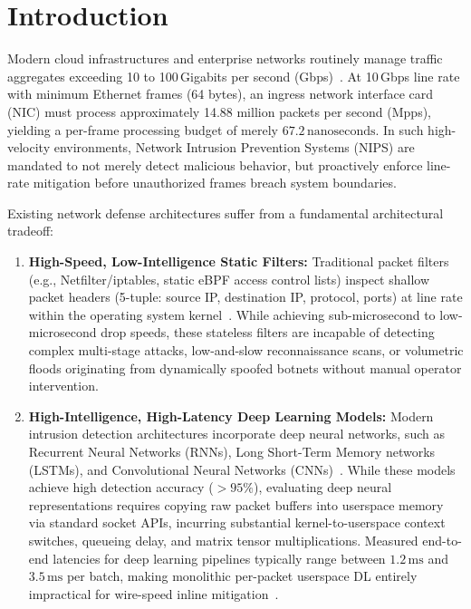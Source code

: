 \documentclass[conference,10pt]{IEEEtran}
\begin{document}
\section{Introduction}
Modern cloud infrastructures and enterprise networks routinely manage traffic aggregates exceeding 10 to 100\,Gigabits per second (Gbps)~\cite{scholz2021performance}. At 10\,Gbps line rate with minimum Ethernet frames (64 bytes), an ingress network interface card (NIC) must process approximately 14.88 million packets per second (Mpps), yielding a per-frame processing budget of merely $67.2\,\text{nanoseconds}$. In such high-velocity environments, Network Intrusion Prevention Systems (NIPS) are mandated to not merely detect malicious behavior, but proactively enforce line-rate mitigation before unauthorized frames breach system boundaries.

Existing network defense architectures suffer from a fundamental architectural tradeoff:
\begin{enumerate}
    \item \textbf{High-Speed, Low-Intelligence Static Filters:} Traditional packet filters (e.g., Netfilter/iptables, static eBPF access control lists) inspect shallow packet headers (5-tuple: source IP, destination IP, protocol, ports) at line rate within the operating system kernel~\cite{mccanne1993bsd, vieira2020fast}. While achieving sub-microsecond to low-microsecond drop speeds, these stateless filters are incapable of detecting complex multi-stage attacks, low-and-slow reconnaissance scans, or volumetric floods originating from dynamically spoofed botnets without manual operator intervention.
    \item \textbf{High-Intelligence, High-Latency Deep Learning Models:} Modern intrusion detection architectures incorporate deep neural networks, such as Recurrent Neural Networks (RNNs), Long Short-Term Memory networks (LSTMs), and Convolutional Neural Networks (CNNs)~\cite{vinayakumar2019deep, bai2018empirical}. While these models achieve high detection accuracy ($> 95\%$), evaluating deep neural representations requires copying raw packet buffers into userspace memory via standard socket APIs, incurring substantial kernel-to-userspace context switches, queueing delay, and matrix tensor multiplications. Measured end-to-end latencies for deep learning pipelines typically range between $1.2\,\text{ms}$ and $3.5\,\text{ms}$ per batch, making monolithic per-packet userspace DL entirely impractical for wire-speed inline mitigation~\cite{sommer2010outside}.
\end{enumerate}
\end{document}
